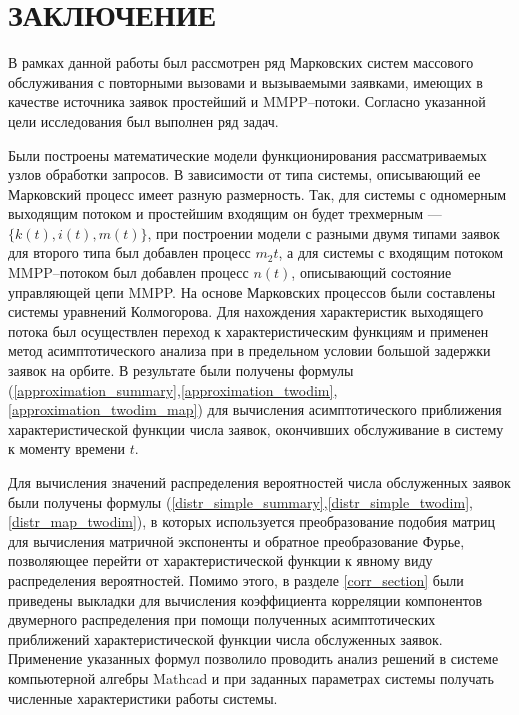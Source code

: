 \section*{\centering\normalsize ЗАКЛЮЧЕНИЕ}
В рамках данной работы был рассмотрен ряд Марковских систем массового обслуживания с повторными вызовами и вызываемыми заявками, имеющих в качестве источника заявок простейший и MMPP--потоки. Согласно указанной цели исследования был выполнен ряд задач.

Были построены математические модели функционирования рассматриваемых узлов обработки запросов. В зависимости от типа системы, описывающий ее Марковский процесс имеет разную размерность. Так, для системы с одномерным выходящим потоком и простейшим входящим он будет трехмерным --- $\{k(t),i(t),m(t)\}$, при построении модели с разными двумя типами заявок для второго типа был добавлен процесс $m_{2}t$, а для системы с входящим потоком MMPP--потоком был добавлен процесс $n(t)$, описывающий состояние управляющей цепи MMPP. На основе Марковских процессов были составлены системы уравнений Колмогорова. Для нахождения характеристик выходящего потока был осуществлен переход к характеристическим функциям и применен метод асимптотического анализа при в предельном условии большой задержки заявок на орбите. В результате были получены формулы (\ref{approximation_summary},\ref{approximation_twodim},\ref{approximation_twodim_map}) для вычисления асимптотического приближения характеристической функции числа заявок, окончивших обслуживание в систему к моменту времени $t$.

Для вычисления значений распределения вероятностей числа обслуженных заявок были получены формулы (\ref{distr_simple_summary},\ref{distr_simple_twodim},\ref{distr_map_twodim}), в которых используется преобразование подобия матриц для вычисления матричной экспоненты и обратное преобразование Фурье, позволяющее перейти от характеристической функции к явному виду распределения вероятностей. Помимо этого, в разделе \ref{corr_section} были приведены выкладки для вычисления коэффициента корреляции компонентов двумерного распределения при помощи полученных асимптотических приближений характеристической функции числа обслуженных заявок. Применение указанных формул позволило проводить анализ решений в системе компьютерной алгебры Mathcad и при заданных параметрах системы получать численные характеристики работы системы.

